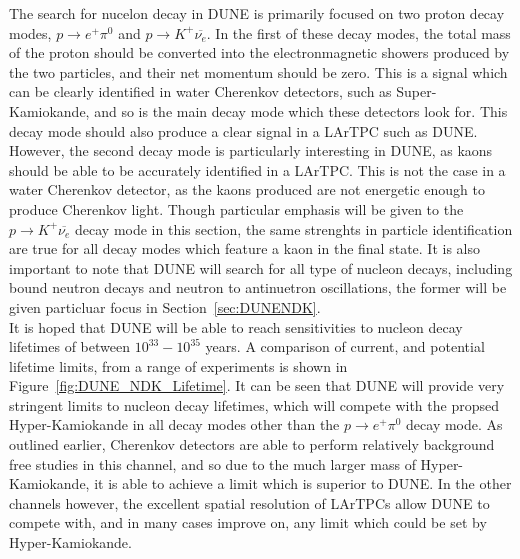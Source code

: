The search for nucelon decay in DUNE is primarily focused on two proton decay modes, $p \rightarrow e^{+} \pi^{0}$ and $p \rightarrow K^{+} \overline{\nu_{e}}$. In the first of these decay modes, the total mass of the proton should be converted into the electronmagnetic showers produced by the two particles, and their net momentum should be zero. This is a signal which can be clearly identified in water Cherenkov detectors, such as Super-Kamiokande, and so is the main decay mode which these detectors look for. This decay mode should also produce a clear signal in a LArTPC such as DUNE. However, the second decay mode is particularly interesting in DUNE, as kaons should be able to be accurately identified in a LArTPC. This is not the case in a water Cherenkov detector, as the kaons produced are not energetic enough to produce Cherenkov light. Though particular emphasis will be given to the $p \rightarrow K^{+} \overline{\nu_{e}}$ decay mode in this section, the same strenghts in particle identification are true for all decay modes which feature a kaon in the final state. It is also important to note that DUNE will search for all type of nucleon decays, including bound neutron decays and neutron to antinuetron oscillations, the former will be given particluar focus in Section~\ref{sec:DUNENDK}. \\

It is hoped that DUNE will be able to reach sensitivities to nucleon decay lifetimes of between $10^{33}-10^{35}$ years. A comparison of current, and potential lifetime limits, from a range of experiments is shown in Figure~\ref{fig:DUNE_NDK_Lifetime}. It can be seen that DUNE will provide very stringent limits to nucleon decay lifetimes, which will compete with the propsed Hyper-Kamiokande in all decay modes other than the $p \rightarrow e^{+} \pi^{0}$ decay mode. As outlined earlier, Cherenkov detectors are able to perform relatively background free studies in this channel, and so due to the much larger mass of Hyper-Kamiokande, it is able to achieve a limit which is superior to DUNE. In the other channels however, the excellent spatial resolution of LArTPCs allow DUNE to compete with, and in many cases improve on, any limit which could be set by Hyper-Kamiokande. \\

